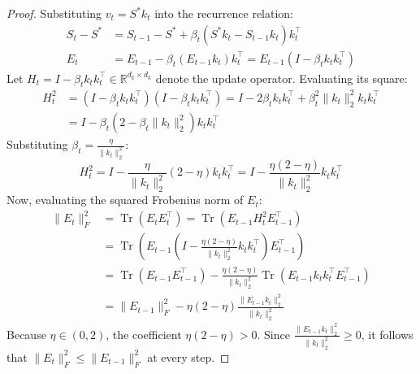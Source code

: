 \documentclass{article}
\begin{document}
\begin{proof}
Substituting $v_t = S^* k_t$ into the recurrence relation:
\begin{align}
    S_t - S^* &= S_{t-1} - S^* + \beta_t (S^* k_t - S_{t-1} k_t) k_t^\top \nonumber \\
    E_t &= E_{t-1} - \beta_t (E_{t-1} k_t) k_t^\top = E_{t-1} \left( I - \beta_t k_t k_t^\top \right)
\end{align}
Let $H_t = I - \beta_t k_t k_t^\top \in \mathbb{R}^{d_k \times d_k}$ denote the update operator. Evaluating its square:
\begin{align}
    H_t^2 &= (I - \beta_t k_t k_t^\top)(I - \beta_t k_t k_t^\top) = I - 2 \beta_t k_t k_t^\top + \beta_t^2 \|k_t\|_2^2 k_t k_t^\top \nonumber \\
    &= I - \beta_t (2 - \beta_t \|k_t\|_2^2) k_t k_t^\top
\end{align}
Substituting $\beta_t = \frac{\eta}{\|k_t\|_2^2}$:
\begin{equation}
    H_t^2 = I - \frac{\eta}{\|k_t\|_2^2} (2 - \eta) k_t k_t^\top = I - \frac{\eta(2 - \eta)}{\|k_t\|_2^2} k_t k_t^\top
\end{equation}
Now, evaluating the squared Frobenius norm of $E_t$:
\begin{align}
    \|E_t\|_F^2 &= \operatorname{Tr}(E_t E_t^\top) = \operatorname{Tr}\left( E_{t-1} H_t^2 E_{t-1}^\top \right) \nonumber \\
    &= \operatorname{Tr}\left( E_{t-1} \left( I - \frac{\eta(2 - \eta)}{\|k_t\|_2^2} k_t k_t^\top \right) E_{t-1}^\top \right) \nonumber \\
    &= \operatorname{Tr}(E_{t-1} E_{t-1}^\top) - \frac{\eta(2 - \eta)}{\|k_t\|_2^2} \operatorname{Tr}\left( E_{t-1} k_t k_t^\top E_{t-1}^\top \right) \nonumber \\
    &= \|E_{t-1}\|_F^2 - \eta(2 - \eta) \frac{\|E_{t-1} k_t\|_2^2}{\|k_t\|_2^2}
\end{align}
Because $\eta \in (0, 2)$, the coefficient $\eta(2 - \eta) > 0$. Since $\frac{\|E_{t-1} k_t\|_2^2}{\|k_t\|_2^2} \ge 0$, it follows that $\|E_t\|_F^2 \le \|E_{t-1}\|_F^2$ at every step.


\end{proof}
\end{document}
